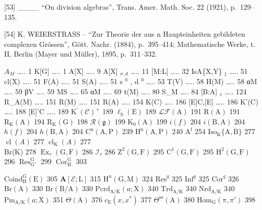 {[}53{]} \_\_\_\_ ``On division algebras'', Trans. Amer. Math. Soc. 22 (1921), p.~129--135.

{[}54{]} K. WEIERSTRASS -- ``Zur Theorie der aus n Haupteinheiten gebildeten complexen Grössen'', Gött. Nachr. (1884), p.~395--414; Mathematische Werke, t. II, Berlin (Mayer und Müller), 1895, p.~311--332.


\(A_{M}\) \ldots.. 1 K{[}G{]} \ldots.. 1 A{[}X{]} \ldots.. 9 A{[}X{]} \(_{\sigma,d}\) \ldots.. 11 {[}M:L{]} \ldots.. 32 IsA\{X,Y\} \(_{\ddagger}\) \ldots.. 51 cl(X) \ldots.. 51 F(A) \ldots.. 51 S(A) \ldots.. 51 s \(^{0}\) , d \(^{0}\) \ldots.. 53 T(V) \ldots.. 58 H(M) \ldots.. 58 αM \ldots.. 59 βV \ldots.. 59 MS \ldots.. 65 αM \ldots.. 69 τ(M) \ldots.. 80 S\_M \ldots.. 84 {[}B:A{]} \(_{s}\) \ldots.. 124 R\_A(M) \ldots.. 151 R(M) \ldots.. 151 R(A) \ldots.. 154 K(C) \ldots.. 186 {[}E{]}C,{[}E{]} \ldots.. 186 K'(C) \ldots.. 188 {[}E{]}'C \ldots.. 189 \(\mathrm{K}^{\prime}(\mathcal{C})^{+}\) 189 \(\ell_{\mathrm{S}}(\mathrm{E})\) 189 \(\mathcal{L}\mathcal{F}(\mathrm{A})\) 191 \(\mathrm{R(A)}\) 191 \(\mathrm{R_K(A)}\) 194 \(\mathrm{R_K(G)}\) 198 \(\mathcal{R}(\mathfrak{g})\) 199 \(\mathrm{K_0(A)}\) 199 \(i(f)\) 204 \(i(\mathrm{B,A})\) 204 \(h(f)\) 204 \(h(\mathrm{B,A})\) 204 \(\mathrm{C^n(A,P)}\) 239 \(\mathrm{H^n(A,P)}\) 240 \(\mathrm{A^f}\) 254 \(\mathrm{Iso}_{\mathrm{K}}\{\mathrm{A},\mathrm{B}\}\) 277 \(\operatorname {cl}(A)\) 277 \(\operatorname {cl}_{\mathrm{K}}(A)\) 277\\
Br(K) 278 \(\operatorname {Ex}_{\tau}(\mathrm{G},\mathrm{F})\) 286 \(\mathcal{I}_{\tau}\) 286 \(\mathrm{Z}^2 (\mathrm{G},\mathrm{F})\) 295 \(\mathrm{C}^1 (\mathrm{G},\mathrm{F})\) 295 \(\mathrm{H}^2 (\mathrm{G},\mathrm{F})\) 296 \(\operatorname {Res}_{\mathrm{G}'}^{\mathrm{G}}\) 299 \(\operatorname {Cor}_{\mathrm{H}}^{\mathrm{G}}\) 303

\(\mathrm{Coind}_{\mathrm{H}}^{\mathrm{G}}(\mathrm{E})\) 305 \(\mathbf{A}[\mathcal{E};\mathrm{L}]\) 315 \(\mathrm{H}^n (\mathrm{G},\mathrm{M})\) 324 \(\mathrm{Res}^q\) 325 \(\mathrm{Inf}^q\) 325 \(\mathrm{Cor}^q\) 326 \(\mathrm{Br(A)}\) 330 \(\mathrm{Br(B / A)}\) 330 \(\mathrm{Pcrd}_{\mathrm{A / K}}(a;\mathrm{X})\) 340 \(\mathrm{Trd}_{\mathrm{A / K}}\) 340 \(\mathrm{Nrd}_{\mathrm{A / K}}\) 340 \(\mathrm{Pm}_{\mathrm{A / K}}(a;\mathrm{X})\) 351 \(\Theta (\mathrm{A})\) 376 \(c_{\mathrm{E}}(x,x^{*})\) 377 \(\Theta^{\mathrm{ss}}(\mathrm{A})\) 380 \(\mathrm{Hom}_{\mathrm{G}}(\pi ,\pi ')\) 398

